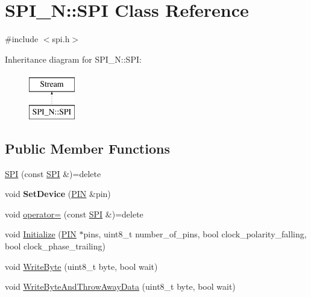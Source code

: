 \hypertarget{class_s_p_i___n_1_1_s_p_i}{\section{S\-P\-I\-\_\-\-N\-:\-:S\-P\-I Class Reference}
\label{class_s_p_i___n_1_1_s_p_i}
}


{\ttfamily \#include $<$spi.\-h$>$}

Inheritance diagram for S\-P\-I\-\_\-\-N\-:\-:S\-P\-I\-:\begin{figure}[H]
\begin{center}
\leavevmode
\includegraphics[height=2.000000cm]{class_s_p_i___n_1_1_s_p_i}
\end{center}
\end{figure}
\subsection*{Public Member Functions}
\begin{DoxyCompactItemize}
\item 
\hyperlink{class_s_p_i___n_1_1_s_p_i_ab486ba0f0d9ec880520e568762cc6c7d}{S\-P\-I} (const \hyperlink{class_s_p_i___n_1_1_s_p_i}{S\-P\-I} \&)=delete
\item 
\hypertarget{class_s_p_i___n_1_1_s_p_i_ad04a79c8e9139545a96af71245ce8d18}{void {\bfseries Set\-Device} (\hyperlink{struct_s_p_i___n_1_1_p_i_n}{P\-I\-N} \&pin)}\label{class_s_p_i___n_1_1_s_p_i_ad04a79c8e9139545a96af71245ce8d18}

\item 
void \hyperlink{class_s_p_i___n_1_1_s_p_i_aabc66612d396c2b70e5cbdba405dbfe5}{operator=} (const \hyperlink{class_s_p_i___n_1_1_s_p_i}{S\-P\-I} \&)=delete
\item 
void \hyperlink{class_s_p_i___n_1_1_s_p_i_ab0517cd53e32d224a0171e6eeb200870}{Initialize} (\hyperlink{struct_s_p_i___n_1_1_p_i_n}{P\-I\-N} $\ast$pins, uint8\-\_\-t number\-\_\-of\-\_\-pins, bool clock\-\_\-polarity\-\_\-falling, bool clock\-\_\-phase\-\_\-trailing)
\item 
void \hyperlink{class_s_p_i___n_1_1_s_p_i_a542dc8e88203de7040ce9926d06b9463}{Write\-Byte} (uint8\-\_\-t byte, bool wait)
\item 
void \hyperlink{class_s_p_i___n_1_1_s_p_i_a05bcca2e033422b2e6ad570320d03fcb}{Write\-Byte\-And\-Throw\-Away\-Data} (uint8\-\_\-t byte, bool wait)
\end{DoxyCompactItemize}
